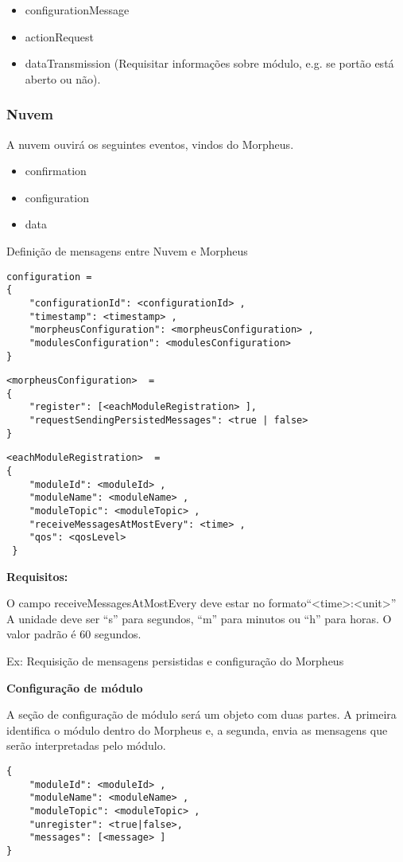\begin{itemize}
\item configurationMessage
\item actionRequest
\item dataTransmission (Requisitar informações sobre módulo, e.g. se portão está aberto ou não).
\end{itemize}

\subsubsection{Nuvem}
A nuvem ouvirá os seguintes eventos, vindos do Morpheus.

\begin{itemize}
\item confirmation
\item configuration
\item data
\end{itemize}

Definição de mensagens entre Nuvem e Morpheus
\begin{lstlisting}
configuration =
{
    "configurationId": <configurationId> ,
    "timestamp": <timestamp> ,
    "morpheusConfiguration": <morpheusConfiguration> ,
    "modulesConfiguration": <modulesConfiguration>
}
\end{lstlisting}

\begin{lstlisting}
<morpheusConfiguration>  =
{
    "register": [<eachModuleRegistration> ],
    "requestSendingPersistedMessages": <true | false>
}
\end{lstlisting}

\begin{lstlisting}
<eachModuleRegistration>  =
{
    "moduleId": <moduleId> ,
    "moduleName": <moduleName> ,
    "moduleTopic": <moduleTopic> ,
    "receiveMessagesAtMostEvery": <time> ,
    "qos": <qosLevel>
 }
 \end{lstlisting}


\textbf{Requisitos:}

O campo receiveMessagesAtMostEvery deve estar no formato“\textless time\textgreater :\textless unit\textgreater ”
A unidade deve ser “s” para segundos, “m” para minutos ou “h” para horas. O valor padrão é 60 segundos.

Ex: Requisição de mensagens persistidas e configuração do Morpheus

\textbf{Configuração de módulo}

A seção de configuração de módulo será um objeto com duas partes. A primeira identifica o módulo dentro do Morpheus e, a segunda, envia as mensagens que serão interpretadas pelo módulo.
\begin{lstlisting}
{
    "moduleId": <moduleId> ,
    "moduleName": <moduleName> ,
    "moduleTopic": <moduleTopic> ,
    "unregister": <true|false>,
    "messages": [<message> ]
}
\end{lstlisting}

